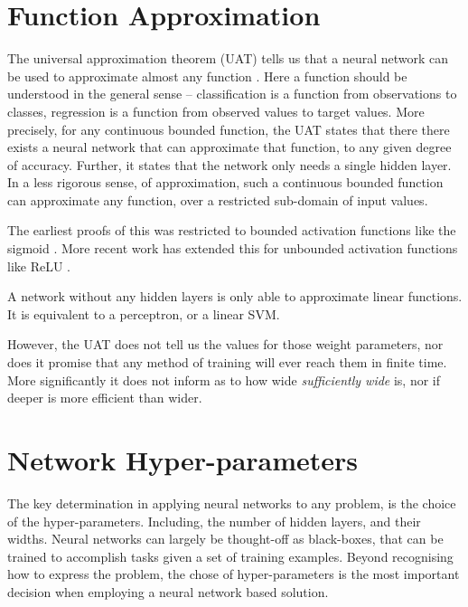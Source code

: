 \documentclass[12pt,parskip]{komatufte}
\begin{document}
\section{Function Approximation}

The universal approximation theorem (UAT) tells us that a neural network can be used to approximate almost any function \parencite{mhaskar1992uat,leshno1993uat,SONODA2017uat}.
Here a function should be understood in the general sense -- classification is a function from observations to classes, regression is a function from observed values to target values.
More precisely, for any continuous bounded function,
the UAT states that there there exists a neural network that can approximate that function, to any given degree of accuracy.
Further, it states that the network only needs a single hidden layer.
In a less rigorous sense, of approximation, such a continuous bounded function can approximate any function, over a restricted sub-domain of input values.

The earliest proofs of this was restricted to bounded activation functions like the sigmoid .
More recent work has extended this for unbounded activation functions like ReLU .

A network without any hidden layers is only able to approximate linear functions.
It is equivalent to a perceptron, or a linear SVM. 


However, the UAT does not tell us the values for those weight parameters,
nor does it promise that any method of training will ever reach them in finite time.
More significantly it does not inform as to how wide \emph{sufficiently wide} is,
nor if deeper is more efficient than wider.


\section{Network Hyper-parameters}

The key determination in applying neural networks to any problem,
is the choice of the hyper-parameters.
Including, the number of hidden layers, and their widths.
Neural networks can largely be thought-off as black-boxes,
that can be trained to  accomplish tasks given a set of training examples.
Beyond recognising how to express the problem,
the chose of hyper-parameters is the most important decision when employing a neural network based solution.
\end{document}
